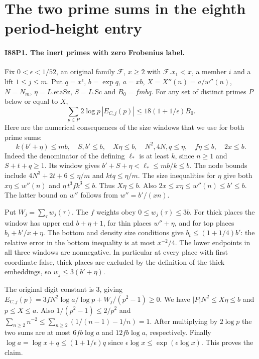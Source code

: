 \section{The two prime sums in the eighth period-height entry}

\paragraph{I88P1. The inert primes with zero Frobenius label.}
Fix $0<\epsilon<1/52$, an original family $\mathcal F$,
$x\ge2$ with $\mathcal F.x_1<x$, a member $i$ and a lift $1\le j\le m$.
Put $q=x^\epsilon$, $b=\exp q$, $a=xb$, $X=X''(n)=a/w''(n)$,
$N=N_m$, $\eta=L.\mathrm{etaSz}$, $S=L.\mathrm{Sc}$ and $B_0=fmbq$.
For any set of distinct primes $P$ below or equal to $X$,
\[
 \sum_{p\in P}2\log p\,|E_{C,j}(p)|
 \le 18(1+1/\epsilon)B_0 .
\]
Here are the numerical consequences of the size windows that we
use for both prime sums:
\[
 k(b'+\eta)\le mb,\quad S,b'\le b,\quad
 X\eta\le b,\quad N^2,4N,q\le\eta,\quad
 f\eta\le b,\quad 2x\le b .
\]
Indeed the denominator of the defining $\ell_*$ is at least $k$,
since $n\ge1$ and $S+t+q\ge1$. Its window gives
$b'+S+\eta<\ell_*\le mb/k\le b$.
The node bounds include $4N^3+2t+6\le\eta/m$ and
$ktq\le\eta/m$. The size inequalities for $\eta$ give both
$x\eta\le w''(n)$ and $\eta\,t^3fk^3\le b$.
Thus $X\eta\le b$. Also $2x\le x\eta\le w''(n)\le b'\le b$.
The latter bound on $w''$ follows from $w''=b'/(xn)$.

Put $W_j=\sum_\tau w_j(\tau)$. The $f$ weights obey
$0\le w_j(\tau)\le 3b$. For thick places the window has upper
end $b+\eta+1$, for thin places $w''+\eta$, and for top
places $b_t+b'/x+\eta$. The bottom and density size conditions
give $b_t\le(1+1/4)b'$: the relative error in the bottom
inequality is at most $x^{-2}/4$. The lower endpoints in all
three windows are nonnegative. In particular at every place
with first coordinate false, thick places are excluded by the
definition of the thick embeddings, so $w_j\le 3(b'+\eta)$.

The original digit constant is $3$, giving
$E_{C,j}(p)=3fN^2\log a/\log p+W_j/(p^2-1)\ge0$.
We have $|P|N^2\le X\eta\le b$ and $p\le X\le a$.
Also $1/(p^2-1)\le2/p^2$ and
$\sum_{n\ge2}n^{-2}\le\sum_{n\ge2}(1/(n-1)-1/n)=1$.
After multiplying by $2\log p$ the two sums are at most
$6fb\log a$ and $12fb\log a$, respectively. Finally
$\log a=\log x+q\le(1+1/\epsilon)q$ since
$\epsilon\log x\le\exp(\epsilon\log x)$. This proves the claim.

